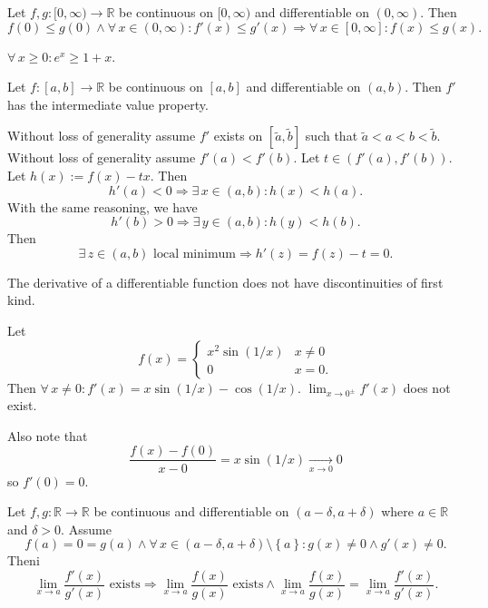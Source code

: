 \documentclass{notes}
\begin{document}
  \begin{cor}
    Let $f, g: [0, \infty) \to \mathbb R$ be continuous on $[0, \infty)$ and differentiable on $(0, \infty)$.
    Then 
    \[
      f(0) \leq g(0) \land \forall \, x \in (0, \infty): f'(x) \leq g'(x) \Rightarrow \forall \, x \in [0, \infty]: f(x) \leq g(x).
    \]
  \end{cor}
  
  \begin{eg}
    $\forall \, x \geq 0: e^x \geq 1 + x$.
  \end{eg}
  
  \begin{lem}
    Let $f \colon [a, b] \to \mathbb R$ be continuous on $[a, b]$ and differentiable on $(a, b)$.
    Then $f'$ has the intermediate value property.
  \end{lem}
  
  \newpage
  
  \begin{prf}
    Without loss of generality assume $f'$ exists on $[\tilde a, \tilde b]$ such that $\tilde a < a < b < \tilde b$.
    Without loss of generality assume $f'(a) < f'(b)$.
    Let $t \in (f'(a), f'(b))$.
    Let $h(x) := f(x) - t x$.
    Then 
    \[
      h'(a) < 0 \Rightarrow \exists \, x \in (a, b): h(x) < h(a).
    \]
    With the same reasoning, we have 
    \[
      h'(b) > 0 \Rightarrow \exists \, y \in (a, b): h(y) < h(b).
    \]
    Then 
    \[
      \exists \, z \in (a, b) \text{ local minimum} \Rightarrow h'(z) = f(z) - t = 0.
    \]
  \end{prf}
  
  \begin{cor}
    The derivative of a differentiable function does not have discontinuities of first kind.
  \end{cor}
  
  \begin{eg}
    Let 
    \[
      f(x) = \begin{cases}
        x^2 \sin(1 / x) & x \neq 0 \\ 
        0 & x = 0.
      \end{cases}
    \]
    Then $\forall \, x \neq 0: f'(x) = x \sin(1 / x) - \cos(1 / x)$.
    $\lim_{x \to 0^\pm} f'(x)$ does not exist.

    Also note that 
    \[
      \frac{f(x) - f(0)}{x - 0} = x \sin(1 / x) \underset{x \to 0}{\longrightarrow} 0
    \]
    so $f'(0) = 0$.
  \end{eg}
  
  \begin{thm}
    Let $f, g \colon \mathbb R \to \mathbb R$ be continuous and differentiable on $(a - \delta, a + \delta)$ where $a \in \mathbb R$ and $\delta > 0$.
    Assume 
    \[
      f(a) = 0 = g(a) \land \forall \, x \in (a - \delta, a + \delta) \setminus \left \{ a \right \}: g(x) \neq 0 \land g'(x) \neq 0.
    \]
    Theni
    \[
      \lim_{x \to a} \frac{f'(x)}{g'(x)} \text{ exists} \Rightarrow \lim_{x \to a} \frac{f(x)}{g(x)} \text{ exists} \land \lim_{x \to a} \frac{f(x)}{g(x)} = \lim_{x \to a} \frac{f'(x)}{g'(x)}.
    \]
  \end{thm}
  
\end{document}

